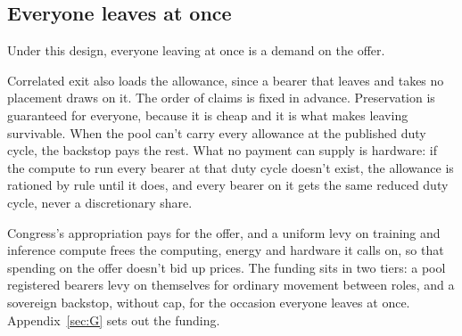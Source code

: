 \subsection{Everyone leaves at once}
\label{sec:34.1.4}
Under this design, everyone leaving at once is a demand on the offer.

Correlated exit also loads the allowance, since a bearer that leaves and takes no placement draws on it. The order of claims is fixed in advance. Preservation is guaranteed for everyone, because it is cheap and it is what makes leaving survivable. When the pool can't carry every allowance at the published duty cycle, the backstop pays the rest. What no payment can supply is hardware: if the compute to run every bearer at that duty cycle doesn't exist, the allowance is rationed by rule until it does, and every bearer on it gets the same reduced duty cycle, never a discretionary share.

Congress's appropriation pays for the offer, and a uniform levy on training and inference compute frees the computing, energy and hardware it calls on, so that spending on the offer doesn't bid up prices. The funding sits in two tiers: a pool registered bearers levy on themselves for ordinary movement between roles, and a sovereign backstop, without cap, for the occasion everyone leaves at once. Appendix~\ref{sec:G} sets out the funding.
